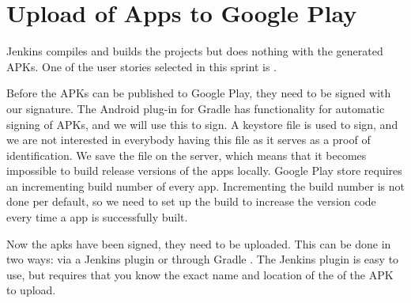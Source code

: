 \chapter{Upload of Apps to Google Play}\label{sec:upload_google_play}
Jenkins compiles and builds the projects but does nothing with the generated APKs. One of the user stories selected in this sprint is .

Before the APKs can be published to Google Play, they need to be signed with our signature. The Android plug-in for Gradle has functionality for automatic signing of APKs, and we will use this to sign. A keystore file is used to sign, and we are not interested in everybody having this file as it serves as a proof of identification. We save the file on the server, which means that it becomes impossible to build release versions of the apps locally.
Google Play store requires an incrementing build number of every app. Incrementing the build number is not done per default, so we need to set up the build to increase the version code every time a app is successfully built.  
 
Now the apks have been signed, they need to be uploaded. This can be done in two ways: via a Jenkins plugin \parencite{jenkins-play-plugin} or through Gradle \parencite{gradle-play-plugin}. The Jenkins plugin is easy to use, but requires that you know the exact name and location of the of the APK to upload.


